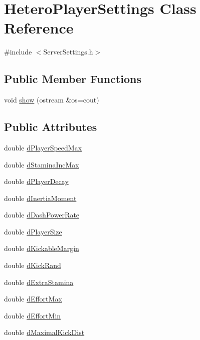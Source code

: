 \hypertarget{classHeteroPlayerSettings}{}\section{Hetero\+Player\+Settings Class Reference}
\label{classHeteroPlayerSettings}


{\ttfamily \#include $<$Server\+Settings.\+h$>$}

\subsection*{Public Member Functions}
\begin{DoxyCompactItemize}
\item 
void \hyperlink{classHeteroPlayerSettings_a36809eb83342f7bcdc564eb030989188}{show} (ostream \&os=cout)
\end{DoxyCompactItemize}
\subsection*{Public Attributes}
\begin{DoxyCompactItemize}
\item 
double \hyperlink{classHeteroPlayerSettings_aa7aeceb8d73822e31567b0fc197c6107}{d\+Player\+Speed\+Max}
\item 
double \hyperlink{classHeteroPlayerSettings_a2ee242dc6e818b579022c7d81c573d86}{d\+Stamina\+Inc\+Max}
\item 
double \hyperlink{classHeteroPlayerSettings_afaa769b7ff145f0f56b3d4fb680ec81a}{d\+Player\+Decay}
\item 
double \hyperlink{classHeteroPlayerSettings_af7a5aad2979e605d3cedecd7b273420c}{d\+Inertia\+Moment}
\item 
double \hyperlink{classHeteroPlayerSettings_ad1faef7180c5118c2ec66ca5d14d8e3f}{d\+Dash\+Power\+Rate}
\item 
double \hyperlink{classHeteroPlayerSettings_ae9141d2aa716dabb576a382c8cbf9c2d}{d\+Player\+Size}
\item 
double \hyperlink{classHeteroPlayerSettings_a45c60e71a86c2424c9639a049b66b1c0}{d\+Kickable\+Margin}
\item 
double \hyperlink{classHeteroPlayerSettings_a3eac27320ad6fdb15c45ee0f1325626e}{d\+Kick\+Rand}
\item 
double \hyperlink{classHeteroPlayerSettings_a79c89d2b0733f8cd5e99ccfc1ddea52e}{d\+Extra\+Stamina}
\item 
double \hyperlink{classHeteroPlayerSettings_a10e6951be049003a8ffc56909a7f29dc}{d\+Effort\+Max}
\item 
double \hyperlink{classHeteroPlayerSettings_aeedb99aad3ee448861d0bc0e543caf81}{d\+Effort\+Min}
\item 
double \hyperlink{classHeteroPlayerSettings_ab91fb7040a4a9eb7acbc82f80b1006a6}{d\+Maximal\+Kick\+Dist}
\end{DoxyCompactItemize}


